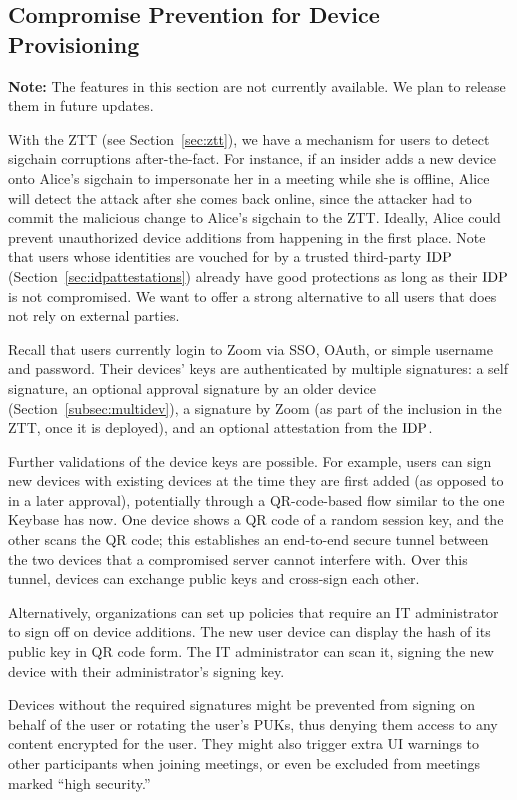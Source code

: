 \subsection{Compromise Prevention for Device Provisioning}\label{subsec:realtime} \textbf{Note: }
The features in this section are not currently available. We plan to release them in future updates.

With the ZTT (see Section~\ref{sec:ztt}), we have a mechanism for users to detect sigchain
corruptions after-the-fact. For instance, if an insider adds a new device onto Alice's sigchain to
impersonate her in a meeting while she is offline, Alice will detect the attack after she comes back
online, since the attacker had to commit the malicious change to Alice's sigchain to the ZTT.
Ideally, Alice could prevent unauthorized device additions from happening in the first place. Note
that users whose identities are vouched for by a trusted third-party $\mathrm{IDP}$
(Section~\ref{sec:idpattestations}) already have good protections as long as their $\mathrm{IDP}$ is not
compromised. We want to offer a strong alternative to all users that does not rely on external
parties.

Recall that users currently login to Zoom via SSO, OAuth, or simple username and password. Their
devices' keys are authenticated by multiple signatures: a self signature, an optional approval
signature by an older device (Section~\ref{subsec:multidev}), a signature by Zoom (as part of the
inclusion in the ZTT, once it is deployed), and an optional attestation from the $\mathrm{IDP}$.

Further validations of the device keys are possible. For example, users can sign new devices with
existing devices at the time they are first added (as opposed to in a later approval), potentially
through a QR-code-based flow similar to the one Keybase has now. One device shows a QR code of a
random session key, and the other scans the QR code; this establishes an end-to-end secure tunnel
between the two devices that a compromised server cannot interfere with. Over this tunnel, devices
can exchange public keys and cross-sign each other.

Alternatively, organizations can set up policies that require an IT administrator to sign off on
device additions. The new user device can display the hash of its public key in QR code form. The IT
administrator can scan it, signing the new device with their administrator's signing key.

Devices without the required signatures might be prevented from signing on behalf of the user or
rotating the user's PUKs, thus denying them access to any content encrypted for the user. They might
also trigger extra UI warnings to other participants when joining meetings, or even be excluded from
meetings marked ``high security.''
